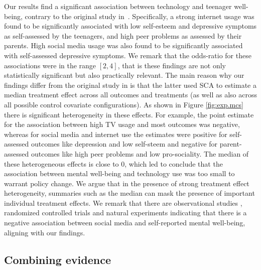 \documentclass[pdflatex,sn-mathphys-num]{sn-jnl}%
\theoremstyle{thmstyleone}%
\theoremstyle{thmstyletwo}%
\theoremstyle{thmstylethree}%
\newcommand{\david}[1]{{\small{\color{blue} \sf $\heartsuit$ [David: #1]}}}
\newcommand{\paul}[1]{{\small{\color{green} \sf $\spadesuit$ Paul: #1}}}
\begin{document}
Our results find a significant association between technology and teenager well-being, contrary to the original study in~\cite{orben:2019}. Specifically, a strong internet usage was found to be significantly associated with low self-esteem and depressive symptoms as self-assessed by the teenagers, and high peer problems as assessed by their parents.
High social media usage was also found to be significantly associated with self-assessed depressive symptoms.
We remark that the odds-ratio for these associations were in the range $[2,4]$, 
that is these findings are not only statistically significant but also practically relevant.
\color{blue} The main reason why our findings differ from the original study in \cite{orben:2019} is that the latter used SCA to estimate a median treatment effect across all outcomes and treatments (as well as also across all possible control covariate configurations). As shown in Figure \ref{fig:exp.mcs} there is significant heterogeneity in these effects. For example, the point estimate for the association between high TV usage and most outcomes was negative, %
whereas for social media and internet use the estimates were positive for self-assessed outcomes like depression and low self-steem and negative for parent-assessed outcomes like high peer problems and low pro-sociality. The median of these heterogeneous effects is close to 0, which led \cite{orben:2019} to conclude that the association between mental well-being and technology use was too small to warrant policy change. We argue that in the presence of strong treatment effect heterogeneity, summaries such as the median can mask the presence of important individual treatment effects.
We remark that there are observational studies \cite{valkenburg:2022}, randomized controlled trials \cite{allcott:2020,allcott:2022} and natural experiments \cite{braghieri:2022} indicating that there is a negative association between social media and self-reported mental well-being, aligning with our findings.
\color{black}


\color{blue}

\subsection{Combining evidence}
\label{ssec:teenager_combining}
\end{document}
